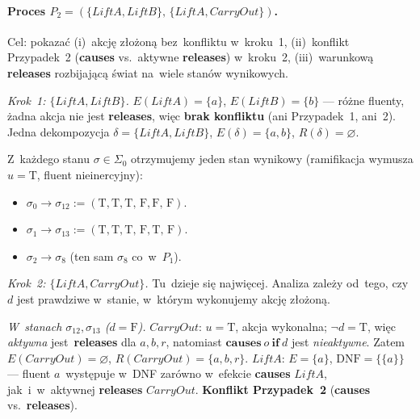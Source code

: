 \documentclass[11pt,a4paper]{article}
\newcommand{\causes}{\textbf{causes}}
\renewcommand{\iff}{\textbf{if}}
\newcommand{\releases}{\textbf{releases}}
\newcommand{\DNF}{\mathrm{DNF}}
\theoremstyle{definition}
\begin{document}
\paragraph{Proces $P_2 = (\{\mathit{LiftA}, \mathit{LiftB}\},\,
\{\mathit{LiftA}, \mathit{CarryOut}\})$.}
Cel: pokazać (i)~akcję złożoną bez~konfliktu w~kroku~1,
(ii)~konflikt Przypadek~2 (\causes{} vs.~aktywne \releases{}) w~kroku~2,
(iii)~warunkową \releases{} rozbijającą świat na~wiele stanów wynikowych.

\medskip
\noindent\textit{Krok~1: $\{\mathit{LiftA}, \mathit{LiftB}\}$.}
$E(\mathit{LiftA}) = \{a\}$, $E(\mathit{LiftB}) = \{b\}$ --- różne fluenty,
żadna akcja nie jest \releases{}, więc \textbf{brak konfliktu} (ani Przypadek~1,
ani~2). Jedna dekompozycja $\delta = \{\mathit{LiftA}, \mathit{LiftB}\}$,
$E(\delta) = \{a, b\}$, $R(\delta) = \varnothing$.

\smallskip
Z~każdego stanu $\sigma \in \Sigma_0$ otrzymujemy jeden stan wynikowy
(ramifikacja wymusza $u = \text{T}$, fluent nieinercyjny):
\begin{itemize}[topsep=2pt]
  \item $\sigma_0 \to \sigma_{12} := (\text{T},\text{T},\text{T},\,\text{F},\text{F},\,\text{F})$.
  \item $\sigma_1 \to \sigma_{13} := (\text{T},\text{T},\text{T},\,\text{F},\text{T},\,\text{F})$.
  \item $\sigma_2 \to \sigma_{8}$ (ten sam $\sigma_8$ co~w~$P_1$).
\end{itemize}

\medskip
\noindent\textit{Krok~2: $\{\mathit{LiftA}, \mathit{CarryOut}\}$.}
Tu~dzieje się najwięcej. Analiza zależy od~tego, czy~$d$ jest prawdziwe
w~stanie, w~którym wykonujemy akcję złożoną.

\smallskip\noindent
\emph{W~stanach $\sigma_{12}, \sigma_{13}$ ($d = \text{F}$).}
$\mathit{CarryOut}$: $u = \text{T}$, akcja wykonalna; $\neg d = \text{T}$,
więc \emph{aktywna} jest~\releases{} dla $a, b, r$, natomiast $\causes\ o\ \iff\ d$
jest \emph{nieaktywne}. Zatem $E(\mathit{CarryOut}) = \varnothing$,
$R(\mathit{CarryOut}) = \{a, b, r\}$.
$\mathit{LiftA}$: $E = \{a\}$, $\DNF = \{\{a\}\}$ --- fluent $a$~występuje
w~DNF zarówno w~efekcie \causes{} $\mathit{LiftA}$, jak~i~w~aktywnej \releases{}
$\mathit{CarryOut}$. \textbf{Konflikt Przypadek~2} (\causes{} vs.~\releases{}).
\end{document}
